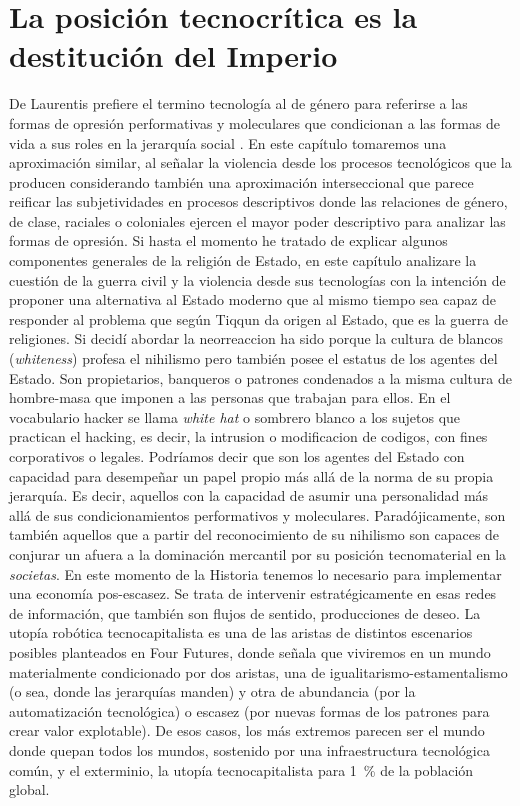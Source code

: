 \chapter{La posición tecnocrítica es la destitución del Imperio}
\label{cha:la-posición-tecnocrítica-es-la-destitución-del-imperio}

De Laurentis prefiere el termino tecnología al de género para referirse a las formas de opresión performativas y moleculares que condicionan a las formas de vida a sus roles en la jerarquía social \autocite{preciadoTestoYonqui2008}. En este capítulo tomaremos una aproximación similar, al señalar la violencia desde los procesos tecnológicos que la producen considerando también una aproximación interseccional que parece reificar las subjetividades en procesos descriptivos donde las relaciones de género, de clase, raciales o coloniales ejercen el mayor poder descriptivo para analizar las formas de opresión. Si hasta el momento he tratado de explicar algunos componentes generales de la religión de Estado, en este capítulo analizare la cuestión de la guerra civil y la violencia desde sus tecnologías con la intención de proponer una alternativa al Estado moderno que al mismo tiempo sea capaz de responder al problema que según Tiqqun da origen al Estado, que es la guerra de religiones. Si decidí abordar la neorreaccion ha sido porque la cultura de blancos (\emph{whiteness}) profesa el nihilismo pero también posee el estatus de los agentes del Estado. Son propietarios, banqueros o patrones condenados a la misma cultura de hombre-masa que imponen a las personas que trabajan para ellos. En el vocabulario hacker se llama \emph{white hat} o sombrero blanco a los sujetos que practican el hacking, es decir, la intrusion o modificacion de codigos, con fines corporativos o legales. Podríamos decir que son los agentes del Estado con capacidad para desempeñar un papel propio más allá de la norma de su propia jerarquía. Es decir, aquellos con la capacidad de asumir una personalidad más allá de sus condicionamientos performativos y moleculares. Paradójicamente, son también aquellos que a partir del reconocimiento de su nihilismo son capaces de conjurar un afuera a la dominación mercantil por su posición tecnomaterial en la \emph{societas}. En este momento de la Historia tenemos lo necesario para implementar una economía pos-escasez. Se trata de intervenir estratégicamente en esas redes de información, que también son flujos de sentido, producciones de deseo. La utopía robótica tecnocapitalista es una de las aristas de distintos escenarios posibles planteados en Four Futures, donde señala que viviremos en un mundo materialmente condicionado por dos aristas, una de igualitarismo-estamentalismo (o sea, donde las jerarquías manden) y otra de abundancia (por la automatización tecnológica) o escasez (por nuevas formas de los patrones para crear valor explotable). De esos casos, los más extremos parecen ser el mundo donde quepan todos los mundos, sostenido por una infraestructura tecnológica común, y el exterminio, la utopía tecnocapitalista para 1~\% de la población global.

